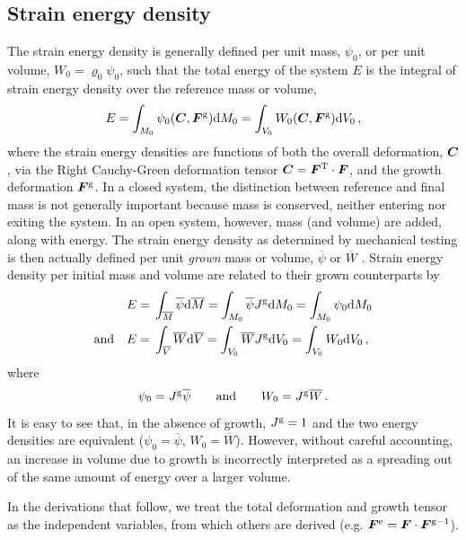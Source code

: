 \documentclass[10pt,letterpaper,oneside]{report}
\newcommand{\sca}[1]{\mbox{\rm{#1}}{}} %
\newcommand{\ten}[1]{\mbox{\boldmath $#1$}{}}
\newcommand{\scas}[1]{\mbox{{\scriptsize{${\rm{#1}}$}}}{}}
\begin{document}
\subsection{Strain energy density}
The strain energy density is generally defined per unit mass, $\psi_0$, or per unit volume, $W_0 = \varrho_0 \psi_0$, such that the total energy of the system $E$ is the integral of strain energy density over the reference mass or volume, 
\begin{equation}
E = \int_{M_0} \psi_0 ( \ten{C}, \ten{F}^{\scas{g}} ) \sca{d}M_0 = \int_{V_0} W_0 ( \ten{C}, \ten{F}^{\scas{g}} ) \sca{d}V_0 \, , 
\end{equation}
where the strain energy densities are functions of both the overall deformation, $\ten{C}$, via 
the Right Cauchy-Green deformation tensor $\ten{C} = \ten{F}^{\scas{T}} \cdot \ten{F}$, and the growth deformation $\ten{F}^{\scas{g}}$.
In a closed system, the distinction between reference and final mass is not generally important because mass is conserved, neither entering nor exiting the system.  In an open system, however, mass (and volume) are added, along with energy.  The strain energy density as determined by mechanical testing is then actually defined per unit \textit{grown} mass or volume, $\overline{\psi}$ or $\overline{W}$ \autocite{Ganghoffer2013}.  Strain energy density per initial mass and volume are related to their grown counterparts by 
\begin{align}
E ={}& \int_{\overline{M}} \overline{\psi} \sca{d}\overline{M} = \int_{M_0} \overline{\psi} J^{\scas{g}} \sca{d}M_0 = \int_{M_0} \psi_0 \sca{d}M_0 
\\ \text{and} \quad 
E ={}& \int_{\overline{V}} \overline{W} \sca{d}\overline{V} = \int_{V_0} \overline{W} J^{\scas{g}} \sca{d}V_0 = \int_{V_0} W_0 \sca{d}V_0 \, , 
\end{align}
where 
\begin{equation}
\psi_0 = J^{\scas{g}} \overline{\psi} \qquad \text{and} \qquad W_0 = J^{\scas{g}} \overline{W} \, . 
\end{equation}
It is easy to see that, in the absence of growth, $J^{\scas{g}} = 1$ and the two energy densities are equivalent ($\psi_0 = \overline{\psi}$, $W_0 = \overline{W}$).  However, without careful accounting, an increase in volume due to growth is incorrectly interpreted as a spreading out of the same amount of energy over a larger volume. 

In the derivations that follow, we treat the total deformation and growth tensor as the independent variables, from which others are derived (e.g. $\ten{F}^{\scas{e}} = \ten{F} \cdot \ten{F}^{\scas{g} -1}$).
\end{document}
